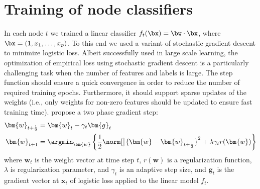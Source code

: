 %

\section{Training of node classifiers}
\label{sec:training_of_node_classifiers}

In each node $t$ we trained a linear classifier $f_t(\bx) = \bw \cdot \bx$, where $\bx = (1, x_1, \ldots, x_p)$.  To this end we used a variant of stochastic gradient descent to minimize logistic loss. Albeit successfully used in large scale learning, the optimization of empirical loss using stochastic gradient descent is a particularly challenging task when the number of features and labels is large. The step function should ensure a quick convergence in order to reduce the number of required training epochs. Furthermore, it should support sparse updates of the weights (i.e., only weights for non-zero features should be updated to ensure fast training time). %
\citet{Duchi_Singer_2009} propose a two phase gradient step:
\begin{align*}
	\label{eq:fobos}
	\bm{w}_{t+\frac12} &= \bm{w}_t - \gamma_t \bm{g}_t\\
	\bm{w}_{t+1} &= \argmin_{\bm{w}}\left\{ \frac12 \norm[\big]{ \bm{w} - \bm{w}_{t+\frac12}}^2
	+ \lambda \gamma_{t} r(\bm{w})\right\}
\end{align*}
where $\bm{w}_t$ is the weight vector at time step $t$, $r(\bm{w})$ is a
regularization function, $\lambda$ is regularization parameter, and $\gamma_t$ is an adaptive step size, and $\bm{g}_t$ is the gradient vector at $\bm{x}_t$ of logistic loss applied to the linear model $f_t$. 

